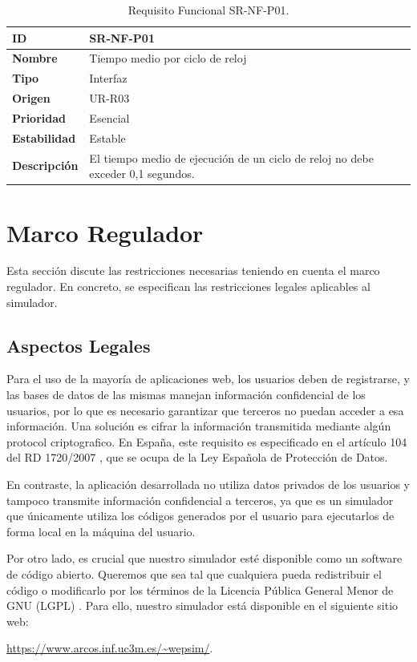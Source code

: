 \begin{center}
\begin{table}[htbp]
\centering
\begin{tabular}{@{}p{2.5cm} p{9cm}@{}} 
\toprule
\textbf{ID} 				& SR-NF-P01 \\
\midrule
\textbf{Nombre} 			& Tiempo medio por ciclo de reloj \\
\midrule
\textbf{Tipo} 			& Interfaz \\
\midrule
\textbf{Origen} 			& UR-R03 \\
\midrule
\textbf{Prioridad}		& Esencial \\
\midrule
\textbf{Estabilidad} 		& Estable \\
\midrule
\textbf{Descripción} 	& El tiempo medio de ejecución de un ciclo de reloj no debe exceder 0,1 segundos. \\
\bottomrule
\end{tabular}
\caption{Requisito Funcional SR-NF-P01.}
\label{tab:srnfp01}
\end{table}
\end{center}

\section{Marco Regulador}
\label{sec:regulatory_framework}

Esta sección discute las restricciones necesarias teniendo en cuenta el marco regulador. En concreto, se especifican las restricciones legales aplicables al simulador.

\subsection{Aspectos Legales}
\label{sec:legal_constraints}

Para el uso de la mayoría de aplicaciones web, los usuarios deben de registrarse, y las bases de datos de las mismas manejan información confidencial de los usuarios, por lo que es necesario garantizar que terceros no puedan acceder a esa información. Una solución es cifrar la información transmitida mediante algún \gls{protocol} criptografico. En España, este requisito es especificado en el artículo 104 del RD 1720/2007 \cite{boe2008}, que se ocupa de la Ley Española de Protección de Datos.


En contraste, la aplicación desarrollada no utiliza datos privados de los usuarios y tampoco transmite información confidencial a terceros, ya que es un simulador que únicamente utiliza los códigos generados por el usuario para ejecutarlos de forma local en la máquina del usuario.


Por otro lado, es crucial que nuestro simulador esté disponible como un software de código abierto. Queremos que sea tal que cualquiera pueda redistribuir el código o modificarlo por los términos de la Licencia Pública General Menor de GNU (LGPL) \cite{gnulgpl}. Para ello, nuestro simulador está disponible en el siguiente sitio web: 

\url{https://www.arcos.inf.uc3m.es/~wepsim/}.

